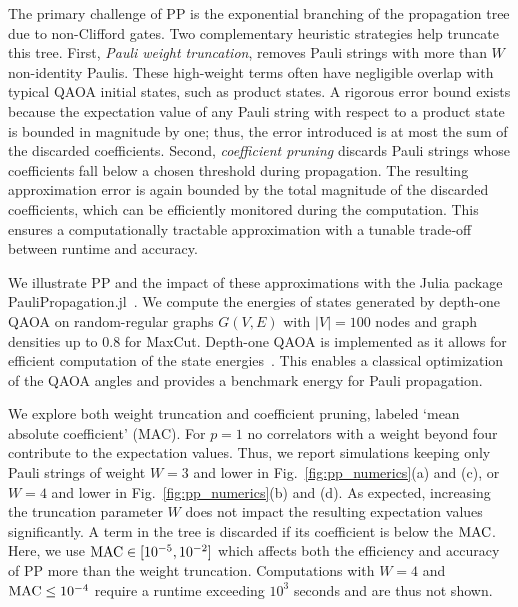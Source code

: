 \documentclass[twocolumn,
english,
aps,
pra,
10pt,
longbibliography,
superscriptaddress,
amsmath,
amssymb,
floatfix
]{revtex4-2}
\begin{document}
The primary challenge of PP is the exponential branching of the propagation tree due to non-Clifford gates.
Two complementary heuristic strategies help truncate this tree. 
First, \emph{Pauli weight truncation}, removes Pauli strings with more than $W$ non-identity Paulis.
These high-weight terms often have negligible overlap with typical QAOA initial states, such as product states. 
A rigorous error bound exists because the expectation value of any Pauli string with respect to a product state is bounded in magnitude by one; thus, the error introduced is at most the sum of the discarded coefficients.
Second, \emph{coefficient pruning} discards Pauli strings whose coefficients fall below a chosen threshold during propagation. 
The resulting approximation error is again bounded by the total magnitude of the discarded coefficients, which can be efficiently monitored during the computation. 
This ensures a computationally tractable approximation with a tunable trade‑off between runtime and accuracy.

We illustrate PP and the impact of these approximations with the Julia package PauliPropagation.jl~\cite{rudolph2025pauli}.
We compute the energies of states generated by depth-one QAOA on random-regular graphs $G(V,E)$ with $|V| = 100$ nodes and graph densities up to 0.8 for MaxCut.
Depth-one QAOA is implemented as it allows for efficient computation of the state energies~\cite{Ozaeta_2022}.
This enables a classical optimization of the QAOA angles and provides a benchmark energy for Pauli propagation.

We explore both weight truncation and coefficient pruning, labeled `mean absolute coefficient' (MAC). 
For $p = 1$ no correlators with a weight beyond four contribute to the expectation values. 
Thus, we report simulations keeping only Pauli strings of weight $W = 3$ and lower in Fig.~\ref{fig:pp_numerics}(a) and (c), or $W = 4$ and lower in Fig.~\ref{fig:pp_numerics}(b) and (d). 
As expected, increasing the truncation parameter $W$ does not impact the resulting expectation values significantly.
A term in the tree is discarded if its coefficient is below the $\rm MAC$.
Here, we use $\rm MAC \in [10^{-5}, 10^{-2}]$ which affects both the efficiency and accuracy of PP more than the weight truncation.
Computations with $W = 4$ and $\rm MAC \leq 10^{-4}$ require a runtime exceeding $10^3$ seconds and are thus not shown.
\end{document}
